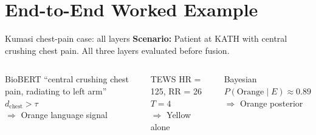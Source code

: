 \section{End-to-End Worked Example}

\begin{frame}{Kumasi chest-pain case: all layers}
  \textbf{Scenario:} Patient at KATH with central crushing chest pain. All three layers evaluated before fusion.

  \vspace{0.3em}
  \begin{columns}[T]
    \begin{block}{BioBERT}
      \small
      ``central crushing chest pain, radiating to left arm''\\
      $d_{\mathrm{chest}} > \tau$\\
      $\Rightarrow$ Orange language signal
    \end{block}

    \begin{block}{TEWS}
      \small
      HR = 125, RR = 26\\
      $T = 4$\\
      $\Rightarrow$ Yellow alone
    \end{block}

    \begin{block}{Bayesian}
      \small
      $P(\mathrm{Orange} \mid E) \approx 0.89$\\
      $\Rightarrow$ Orange posterior
    \end{block}
  \end{columns}
\end{frame}


